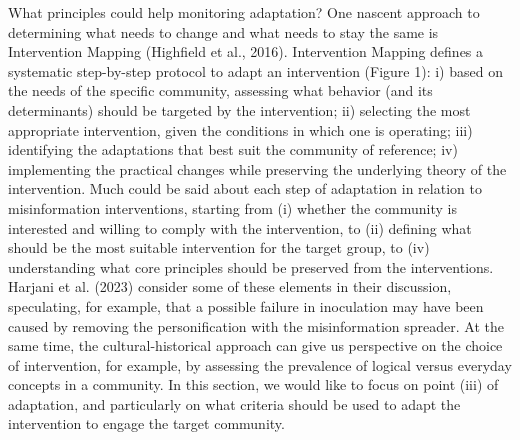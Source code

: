 \documentclass[authordate, reflection]{jote-new-article}
\begin{document}
	What principles could help monitoring adaptation? One nascent approach to determining what needs to change and what needs to stay the same is Intervention Mapping (Highfield et al., 2016). Intervention Mapping defines a systematic step-by-step protocol to adapt an intervention (Figure 1): i) based on the needs of the specific community, assessing what behavior (and its determinants) should be targeted by the intervention; ii) selecting the most appropriate intervention, given the conditions in which one is operating; iii) identifying the adaptations that best suit the community of reference; iv) implementing the practical changes while preserving the underlying theory of the intervention. Much could be said about each step of adaptation in relation to misinformation interventions, starting from (i) whether the community is interested and willing to comply with the intervention, to (ii) defining what should be the most suitable intervention for the target group, to (iv) understanding what core principles should be preserved from the interventions. Harjani et al. (2023) consider some of these elements in their discussion, speculating, for example, that a possible failure in inoculation may have been caused by removing the personification with the misinformation spreader. At the same time, the cultural-historical approach can give us perspective on the choice of intervention, for example, by assessing the prevalence of logical versus everyday concepts in a community. In this section, we would like to focus on point (iii) of adaptation, and particularly on what criteria should be used to adapt the intervention to engage the target community.
\end{document}
